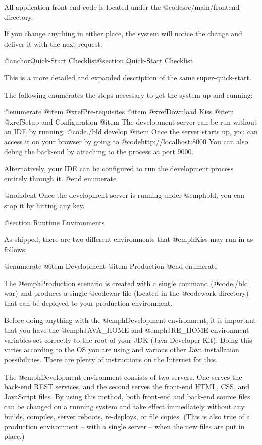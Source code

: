 All application front-end code is located under the @code{src/main/frontend}
directory.

If you change anything in either place, the system will notice the change 
and deliver it with the next request.


@anchor{Quick-Start Checklist}@section Quick-Start Checklist

This is a more detailed and expanded description of the same
super-quick-start.

The following enumerates the steps necessary to get the system up and running:

@enumerate
@item
@xref{Pre-requisites}
@item
@xref{Download Kiss}
@item
@xref{Setup and Configuration}
@item
The development server can be run without an IDE by running: @code{./bld develop}
@item
Once the server starts up, you can access it on your browser by going to 
@code{http://localhost:8000}  You can also debug the back-end by
attaching to the process at port 9000.

Alternatively, your IDE can be configured to run the development
process entirely through it.
@end enumerate

@noindent Once the development server is running under @emph{bld}, you can stop it 
by hitting any key.

@section Runtime Environments

As shipped, there are two different environments that @emph{Kiss} may
run in as follows:

@enumerate
@item
Development
@item 
Production
@end enumerate

The @emph{Production} scenario is created with a single command
(@code{./bld war}) and produces a single @code{war} file (located in
the @code{work} directory) that can be deployed to your production
environment.

Before doing anything with the @emph{Development} environment, it is
important that you have the @emph{JAVA_HOME} and @emph{JRE_HOME}
environment variables set correctly to the root of your JDK (Java
Developer Kit).  Doing this varies according to the OS you are using
and various other Java installation possibilities.  There are plenty
of instructions on the Internet for this.

The @emph{Development} environment consists of two servers.  One
serves the back-end REST services, and the second serves the front-end
HTML, CSS, and JavaScript files.  By using this method, both front-end
and back-end source files can be changed on a running system and take
effect immediately without any builds, compiles, server reboots,
re-deploys, or file copies.  (This is also true of a production
environment -- with a single server -- when the new files are put in place.)

